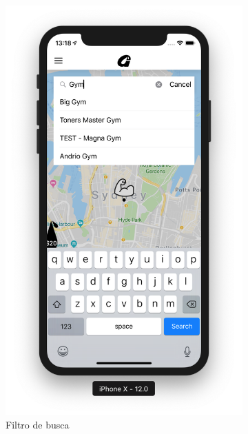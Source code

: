 \begin{figure}[H]
\begin{subfigure}[b]{0.3\textwidth}
        \includegraphics[width=\textwidth]{pfc/figuras/tr-map-search.png}
        \caption{Filtro de busca}
        \label{fig:tr-map-search}
    \end{subfigure}
    ~
    \begin{subfigure}[b]{0.3\textwidth}

\end{subfigure}
\end{figure}
